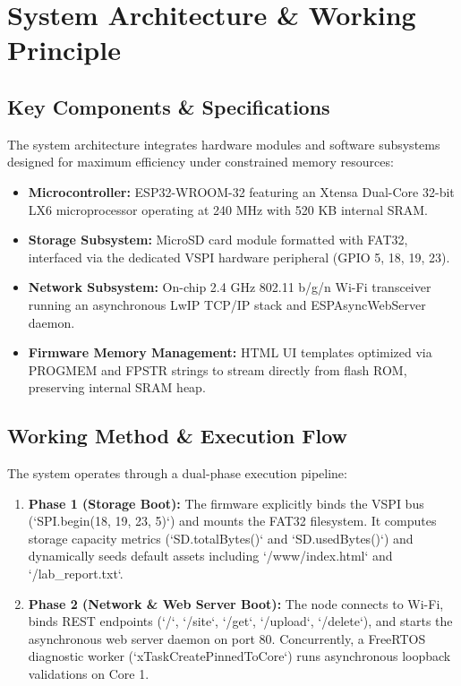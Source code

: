 \documentclass[conference]{IEEEtran}
\begin{document}
\section{System Architecture \& Working Principle}

\subsection{Key Components \& Specifications}
The system architecture integrates hardware modules and software subsystems designed for maximum efficiency under constrained memory resources:
\begin{itemize}
    \item \textbf{Microcontroller:} ESP32-WROOM-32 featuring an Xtensa Dual-Core 32-bit LX6 microprocessor operating at 240 MHz with 520 KB internal SRAM.
    \item \textbf{Storage Subsystem:} MicroSD card module formatted with FAT32, interfaced via the dedicated VSPI hardware peripheral (GPIO 5, 18, 19, 23).
    \item \textbf{Network Subsystem:} On-chip 2.4 GHz 802.11 b/g/n Wi-Fi transceiver running an asynchronous LwIP TCP/IP stack and ESPAsyncWebServer daemon.
    \item \textbf{Firmware Memory Management:} HTML UI templates optimized via PROGMEM and FPSTR strings to stream directly from flash ROM, preserving internal SRAM heap.
\end{itemize}

\subsection{Working Method \& Execution Flow}
The system operates through a dual-phase execution pipeline:
\begin{enumerate}
    \item \textbf{Phase 1 (Storage Boot):} The firmware explicitly binds the VSPI bus (`SPI.begin(18, 19, 23, 5)`) and mounts the FAT32 filesystem. It computes storage capacity metrics (`SD.totalBytes()` and `SD.usedBytes()`) and dynamically seeds default assets including `/www/index.html` and `/lab_report.txt`.
    \item \textbf{Phase 2 (Network & Web Server Boot):} The node connects to Wi-Fi, binds REST endpoints (`/`, `/site`, `/get`, `/upload`, `/delete`), and starts the asynchronous web server daemon on port 80. Concurrently, a FreeRTOS diagnostic worker (`xTaskCreatePinnedToCore`) runs asynchronous loopback validations on Core 1.
\end{enumerate}
\end{document}
